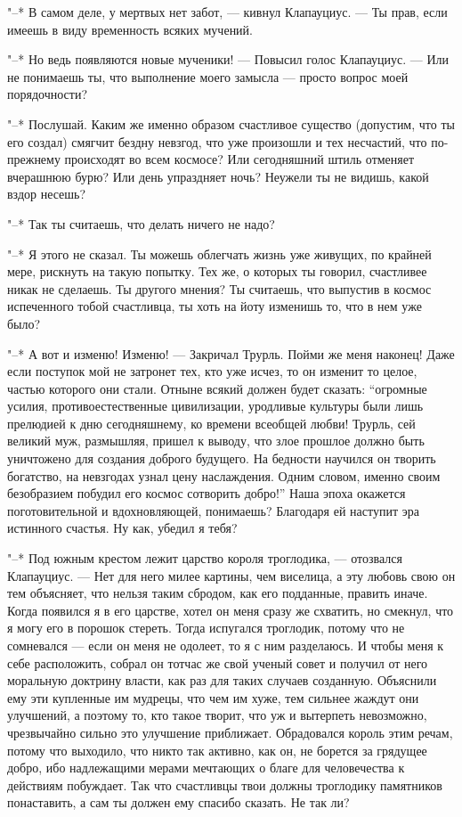 "--* В самом деле, у мертвых нет забот, --- кивнул
Клапауциус. --- Ты прав, если имеешь в виду временность
всяких мучений.

"--* Но ведь появляются новые мученики! --- Повысил голос
Клапауциус. --- Или не понимаешь ты, что выполнение моего
замысла --- просто вопрос моей порядочности?

"--* Послушай. Каким же именно образом счастливое существо
(допустим, что ты его создал) смягчит бездну невзгод, что
уже произошли и тех несчастий, что по-прежнему происходят во
всем космосе? Или сегодняшний штиль отменяет вчерашнюю бурю?
Или день упраздняет ночь? Неужели ты не видишь, какой вздор
несешь?

"--* Так ты считаешь, что делать ничего не надо?

"--* Я этого не сказал. Ты можешь облегчать жизнь уже
живущих, по крайней мере, рискнуть на такую попытку. Тех же,
о которых ты говорил, счастливее никак не сделаешь. Ты
другого мнения? Ты считаешь, что выпустив в космос
испеченного тобой счастливца, ты хоть на йоту изменишь то,
что в нем уже было?

"--* А вот  и изменю! Изменю! --- Закричал  Трурль. Пойми же
меня  наконец!  Даже  если  поступок мой  не  затронет  тех,
кто  уже исчез,  то  он изменит  то  целое, частью  которого
они стали.  Отныне всякий  должен будет  сказать: ``огромные
усилия, противоестественные  цивилизации, уродливые культуры
были лишь прелюдией к  дню сегодняшнему, ко времени всеобщей
любви! Трурль, сей великий  муж, размышляя, пришел к выводу,
что злое прошлое должно быть уничтожено для создания доброго
будущего.  На бедности  научился  он  творить богатство,  на
невзгодах узнал цену наслаждения. Одним словом, именно своим
безобразием  побудил  его  космос  сотворить  добро!''  Наша
эпоха окажется  поготовительной и  вдохновляющей, понимаешь?
Благодаря ей наступит эра  истинного счастья. Ну как, убедил
я тебя?

"--* Под южным крестом лежит царство короля троглодика, --- отозвался
Клапауциус. --- Нет для него милее картины, чем
виселица, а эту любовь свою он тем объясняет, что нельзя
таким сбродом, как его подданные, править иначе. Когда
появился я в его царстве, хотел он меня сразу же схватить,
но смекнул, что я могу его в порошок стереть. Тогда
испугался троглодик, потому что не сомневался --- если он меня
не одолеет, то я с ним разделаюсь. И чтобы меня к себе
расположить, собрал он тотчас же свой ученый совет и получил
от него моральную доктрину власти, как раз для таких случаев
созданную. Объяснили ему эти купленные им мудрецы, что чем
им хуже, тем сильнее жаждут они улучшений, а поэтому то, кто
такое творит, что уж и вытерпеть невозможно, чрезвычайно
сильно это улучшение приближает. Обрадовался король этим
речам, потому что выходило, что никто так активно, как он,
не борется за грядущее добро, ибо надлежащими мерами
мечтающих о благе для человечества к действиям побуждает.
Так что счастливцы твои должны троглодику памятников
понаставить, а сам ты должен ему спасибо сказать. Не так ли?


